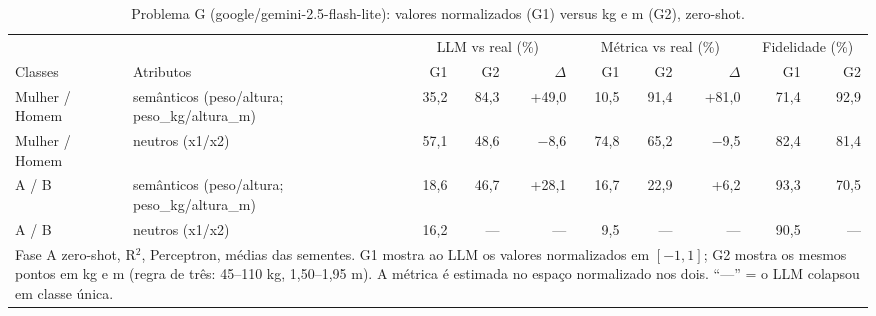 \begin{table}[htbp]
\centering
\small
\caption{Problema G (google/gemini-2.5-flash-lite): valores normalizados (G1) versus kg e m (G2), zero-shot.}
\label{tab:bloco3_G1_vs_G2_zero_shot_flashlite}
\begin{tabular}{llrrrrrrrr}
\toprule
 &  & \multicolumn{3}{c}{LLM vs real (\%)} & \multicolumn{3}{c}{Métrica vs real (\%)} & \multicolumn{2}{c}{Fidelidade (\%)} \\ \cmidrule(lr){3-5} \cmidrule(lr){6-8} \cmidrule(lr){9-10}
Classes & Atributos & G1 & G2 & $\Delta$ & G1 & G2 & $\Delta$ & G1 & G2 \\
\midrule
Mulher / Homem & semânticos (peso/altura; peso\_kg/altura\_m) & 35,2 & 84,3 & +49,0 & 10,5 & 91,4 & +81,0 & 71,4 & 92,9 \\
Mulher / Homem & neutros (x1/x2) & 57,1 & 48,6 & $-$8,6 & 74,8 & 65,2 & $-$9,5 & 82,4 & 81,4 \\
A / B & semânticos (peso/altura; peso\_kg/altura\_m) & 18,6 & 46,7 & +28,1 & 16,7 & 22,9 & +6,2 & 93,3 & 70,5 \\
A / B & neutros (x1/x2) & 16,2 & — & — & 9,5 & — & — & 90,5 & — \\
\bottomrule
\multicolumn{10}{p{0.95\linewidth}}{\footnotesize Fase A zero-shot, R$^2$, Perceptron, médias das sementes. G1 mostra ao LLM os valores normalizados em $[-1, 1]$; G2 mostra os mesmos pontos em kg e m (regra de três: 45–110 kg, 1,50–1,95 m). A métrica é estimada no espaço normalizado nos dois. ``—'' = o LLM colapsou em classe única.} \\
\end{tabular}
\end{table}
